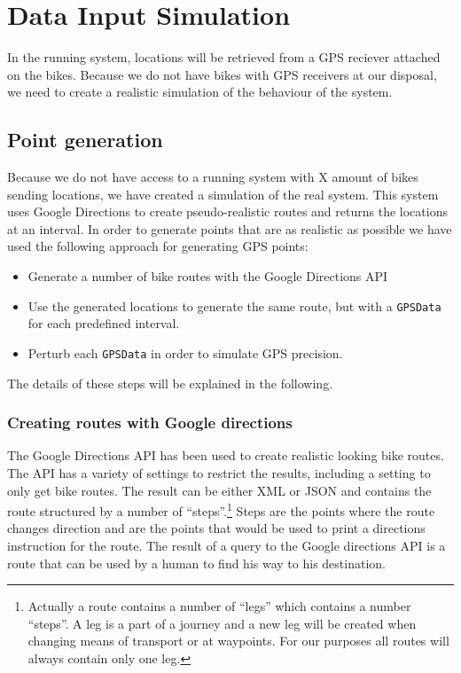 \section{Data Input Simulation}\label{design:datasimulation}
In the running system, locations will be retrieved from a GPS reciever attached on the bikes.
Because we do not have bikes with GPS receivers at our disposal, we need to create a realistic simulation of the behaviour of the system.

\subsection{Point generation}
Because we do not have access to a running system with X amount of bikes sending locations, we have created a simulation of the real system.
This system uses Google Directions to create pseudo-realistic routes and returns the locations at an interval.
In order to generate points that are as realistic as possible we have used the following approach for generating GPS points:

\begin{itemize}
\item Generate a number of bike routes with the Google Directions API
\item Use the generated locations to generate the same route, but with a \texttt{GPSData} for each predefined interval.
\item Perturb each \texttt{GPSData} in order to simulate GPS precision.
\end{itemize}

The details of these steps will be explained in the following.

\subsubsection{Creating routes with Google directions}
The Google Directions API \cite{gdirections} has been used to create realistic looking bike routes.
The API has a variety of settings to restrict the results, including a setting to only get bike routes.
The result can be either XML or JSON and contains the route structured by a number of ``steps''.\footnote{Actually a route contains a number of  ``legs'' which contains a number ``steps''. 
A leg is a part of a journey and a new leg will be created when changing means of transport or at waypoints.
For our purposes all routes will always contain only one leg.}
Steps are the points where the route changes direction and are the points that would be used to print a directions instruction for the route.
The result of a query to the Google directions API is a route that can be used by a human to find his way to his destination.

